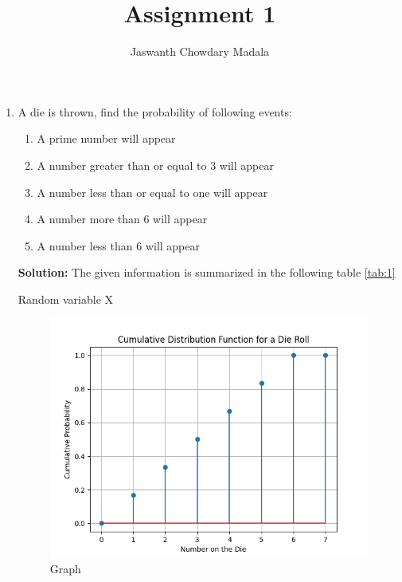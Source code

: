 \documentclass[journal,12pt,twocolumn]{IEEEtran}
\begin{document}
\vspace{3cm}


\title{Assignment 1}
\author{Jaswanth Chowdary Madala}





\maketitle

\newpage


\bigskip

\renewcommand{\thefigure}{\theenumi}
\renewcommand{\thetable}{\theenumi}



\begin{enumerate}
\item A die is thrown, find the probability of following events:
\begin{enumerate}
\item A prime number will appear
\item A number greater than or equal to 3 will appear
\item A number less than or equal to one will appear
\item A number more than 6 will appear
\item A number less than 6 will appear
\end{enumerate}
\textbf{Solution:} The given information is summarized in the following table \ref{tab:1}
\begin{table}[h]
\centering

\caption{Random variable X}
\label{tab:1}
\end{table}
\begin{figure}[ht]
\centering
\includegraphics[width = \columnwidth]{"figs/fig.png"}
\caption{Graph}
\label{fig:1}
\end{figure}


\end{enumerate}
\end{document}
